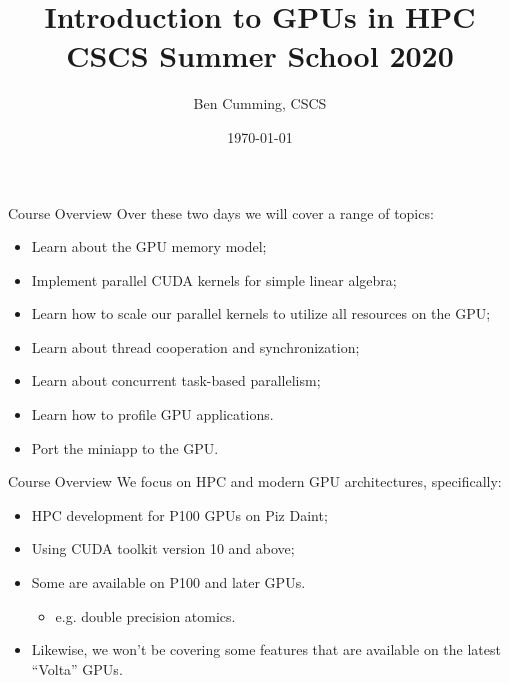 \documentclass[aspectratio=43]{beamer}
\author{Ben Cumming, CSCS}
\title{Introduction to GPUs in HPC\\CSCS Summer School 2020}
\subtitle{}
\date{\today}
\begin{document}
\cscstitle


\begin{frame}[fragile]{Course Overview}
    Over these two days we will cover a range of topics:
    \begin{itemize}
        \item Learn about the GPU memory model;
        \item Implement parallel CUDA kernels for simple linear algebra;
        \item Learn how to scale our parallel kernels to utilize all resources on the GPU;
        \item Learn about thread cooperation and synchronization;
        \item Learn about concurrent task-based parallelism;
        \item Learn how to profile GPU applications.
        \item Port the miniapp to the GPU.
    \end{itemize}
\end{frame}

\begin{frame}[fragile]{Course Overview}
    We focus on HPC and modern GPU architectures, specifically:
    \begin{itemize}
        \item HPC development for P100 GPUs on Piz Daint;
        \item Using CUDA toolkit version 10 and above;
        \item Some are available on P100 and later GPUs.
        \begin{itemize}
            \item  e.g. double precision atomics.
        \end{itemize}
        \item Likewise, we won't be covering some features that are available on the latest ``Volta'' GPUs.
    \end{itemize}
\end{frame}
\end{document}
